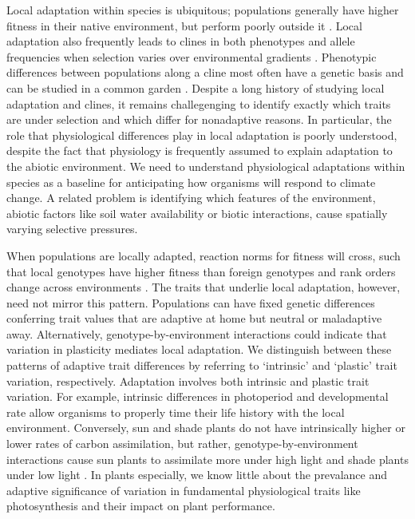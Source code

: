 \documentclass[11pt, oneside]{article}
\begin{document}

Local adaptation within species is ubiquitous; populations generally have higher fitness in their native environment, but perform poorly outside it \citep{Schluter_2000, Hereford_2009}. Local adaptation also frequently leads to clines in both phenotypes and allele frequencies when selection varies over environmental gradients \citep{Huxley_1938, Endler_1977}. Phenotypic differences between populations along a cline most often have a genetic basis and can be studied in a common garden \citep{Turesson_1922, Clausen_etal_1940, Hiesey_etal_1942}. Despite a long history of studying local adaptation and clines, it remains challegenging to identify exactly which traits are under selection and which differ for nonadaptive reasons. In particular, the role that physiological differences play in local adaptation is poorly understood, despite the fact that physiology is frequently assumed to explain adaptation to the abiotic environment. We need to understand physiological adaptations within species as a baseline for anticipating how organisms will respond to climate change. A related problem is identifying which features of the environment, abiotic factors like soil water availability or biotic interactions, cause spatially varying selective pressures. %

When populations are locally adapted, reaction norms for fitness will cross, such that local genotypes have higher fitness than foreign genotypes and rank orders change across environments \citep{Kawecki_Ebert_2004}. The traits that underlie local adaptation, however, need not mirror this pattern. Populations can have fixed genetic differences conferring trait values that are adaptive at home but neutral or maladaptive away. Alternatively, genotype-by-environment interactions could indicate that variation in plasticity mediates local adaptation. We distinguish between these patterns of adaptive trait differences by referring to `intrinsic' and `plastic' trait variation, respectively. Adaptation involves both intrinsic and plastic trait variation. For example, intrinsic differences in photoperiod \citep{Blackman_etal_2011} and developmental rate \citep{Stinchcombe_etal_2004} allow organisms to properly time their life history with the local environment. Conversely, sun and shade plants do not have intrinsically higher or lower rates of carbon assimilation, but rather, genotype-by-environment interactions cause sun plants to assimilate more under high light and shade plants under low light \citep{Givnish_1988}. In plants especially, we know little about the prevalance and adaptive significance of variation in fundamental physiological traits like photosynthesis and their impact on plant performance.
\end{document}
